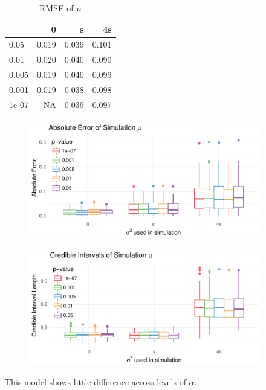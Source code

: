 \documentclass[AMA,STIX1COL]{WileyNJD-v2}\usepackage[]{graphicx}\usepackage[]{color}
\newenvironment{knitrout}{}{} %
\begin{document}
\begin{knitrout}
\color{fgcolor}\begin{table}

\caption{\label{tab:unnamed-chunk-28}RMSE of $\mu$}
\centering
\begin{tabular}[t]{l|r|r|r}
\hline
  & 0 & s & 4s\\
\hline
0.05 & 0.019 & 0.039 & 0.101\\
\hline
0.01 & 0.020 & 0.040 & 0.090\\
\hline
0.005 & 0.019 & 0.040 & 0.099\\
\hline
0.001 & 0.019 & 0.038 & 0.098\\
\hline
1e-07 & NA & 0.039 & 0.097\\
\hline
\end{tabular}
\end{table}


\end{knitrout}



\begin{figure}
\begin{knitrout}
\color{fgcolor}

{\centering \includegraphics[width=4in]{figure/unnamed-chunk-29-1} 

}



\end{knitrout}
\end{figure}


\begin{figure}
\begin{knitrout}
\color{fgcolor}

{\centering \includegraphics[width=4in]{figure/unnamed-chunk-30-1} 

}



\end{knitrout}
\end{figure}
This model shows little difference across levels of $\alpha$.
\end{document}
